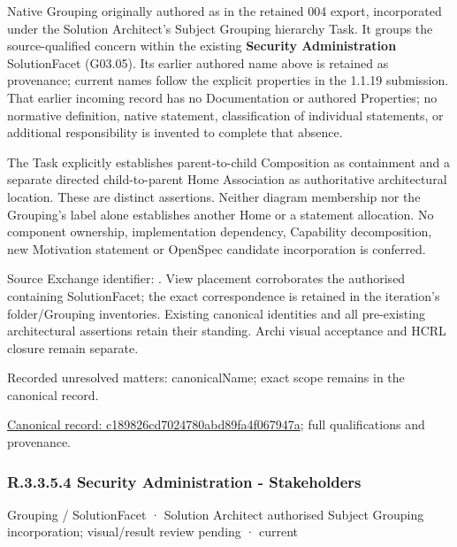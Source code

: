Native Grouping originally authored as \texttt{} in the retained 004 export,
incorporated under the Solution Architect's Subject Grouping hierarchy Task.
It groups the source-qualified \texttt{} concern within
the existing \textbf{Security Administration} SolutionFacet (G03.05). Its earlier authored name above is retained as provenance; current names
follow the explicit properties in the 1.1.19 submission.
That earlier incoming record has no Documentation or authored Properties; no normative
definition, native statement, classification of individual statements, or
additional responsibility is invented to complete that absence.



The Task explicitly establishes parent-to-child Composition as containment and
a separate directed child-to-parent Home Association as authoritative architectural
location. These are distinct assertions. Neither diagram membership nor the
Grouping's label alone establishes another Home or a statement allocation.
No component ownership, implementation dependency, Capability decomposition,
new Motivation statement or OpenSpec candidate incorporation is conferred.



Source Exchange identifier: \texttt{}. View placement corroborates
the authorised containing SolutionFacet; the exact correspondence is retained in the
iteration's folder/Grouping inventories. Existing canonical identities and all
pre-existing architectural assertions retain their standing. Archi visual
acceptance and HCRL closure remain separate.


{\small Recorded unresolved matters: canonicalName; exact scope remains in the canonical record.}\par
{\footnotesize \href{../../../../../../../continuum/grouping/c189826cd7024780abd89fa4f067947a.md}{Canonical record: c189826cd7024780abd89fa4f067947a}; full qualifications and provenance.}\par
\subsubsection*{R.3.3.5.4 Security Administration - Stakeholders}
\label{navigation:R.3.3.5.4}

\label{element:980b414d73614bd48bc47a6aaa718a51}
{\small Grouping / SolutionFacet · Solution Architect authorised Subject Grouping incorporation; visual/result review pending · current}\par

